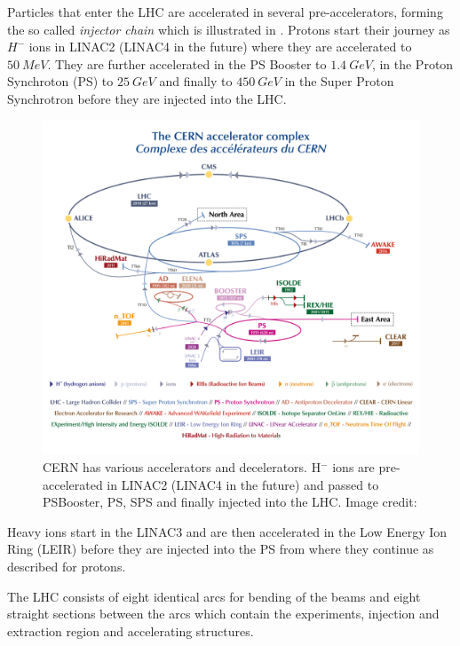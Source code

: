 Particles that enter the LHC are accelerated in several pre-accelerators, forming the so called
\emph{injector chain}\cite{Schindl1999} which is illustrated in .
Protons start their journey as $H^-$ ions in LINAC2 (LINAC4 in the future) where
they are accelerated to $\SI{50}{MeV}$. They are further accelerated in the PS Booster to $\SI{1.4}{GeV}$,
in the Proton Synchroton (PS) to $\SI{25}{GeV}$ and finally to $\SI{450}{GeV}$ in the Super Proton Synchrotron
before they are injected into the LHC.
%
\begin{figure}[ht]
    \centering
    \includegraphics[width=\textwidth]{CCC-v2019-final-white_small}
    \caption{CERN has various accelerators and decelerators. H$^-$ ions are pre-accelerated
    in LINAC2 (LINAC4 in the future) and passed to PSBooster, PS, SPS and finally injected into
    the LHC. Image credit: \cite{CERN_AccCmplx}}
    \label{fig_cern_acc_cmplx}
\end{figure}
%
Heavy ions start in the LINAC3 and are then accelerated in the Low Energy Ion Ring (LEIR) before they are injected into
the PS from where they continue as described for protons.

The LHC consists of eight identical arcs for bending of the beams and eight straight sections between the
arcs which contain the experiments, injection and extraction region and accelerating structures.

